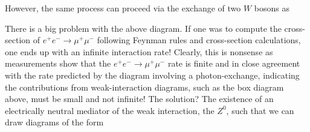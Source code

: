 However, the same process can proceed via the exchange of two $W$ bosons as

\begin{center}
\end{center}

There is a big problem with the above diagram. If one was to compute the cross-section of $e^+e^-\to \mu^+\mu^-$ following Feynman rules and cross-section calculations, one ends up with an infinite interaction rate! Clearly, this is nonsense as measurements show that the $e^+e^-\to \mu^+\mu^-$ rate is finite and in close agreement with the rate predicted by the diagram involving a photon-exchange, indicating the contributions from weak-interaction diagrams, such as the box diagram above, must be small and not infinite! The solution? The existence of an electrically neutral mediator of the weak interaction, the $Z^0$, such that we can draw diagrams of the form

